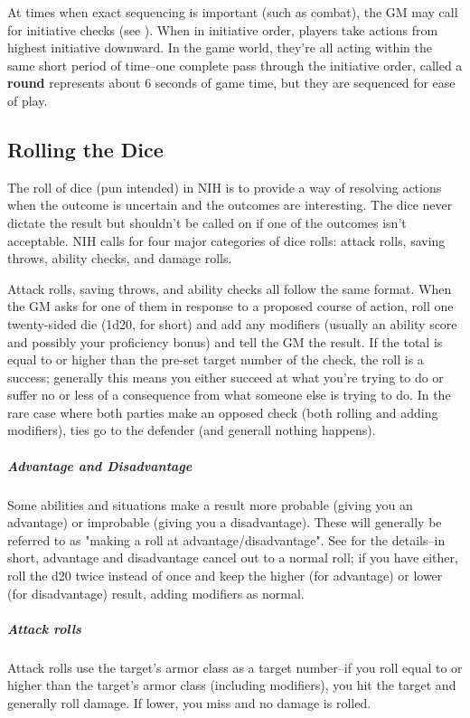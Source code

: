 At times when exact sequencing is important (such as combat), the GM may call for initiative checks (see ). When in initiative order, players take actions from highest initiative downward. In the game world, they're all acting within the same short period of time--one complete pass through the initiative order, called a \textbf{round} represents about 6 seconds of game time, but they are sequenced for ease of play.

\subsection{Rolling the Dice}
The roll of dice (pun intended) in NIH is to provide a way of resolving actions when the outcome is uncertain and the outcomes are interesting. The dice never dictate the result but shouldn't be called on if one of the outcomes isn't acceptable. NIH calls for four major categories of dice rolls: attack rolls, saving throws, ability checks, and damage rolls.

Attack rolls, saving throws, and ability checks all follow the same format. When the GM asks for one of them in response to a proposed course of action, roll one twenty-sided die (1d20, for short) and add any modifiers (usually an ability score and possibly your proficiency bonus) and tell the GM the result. If the total is equal to or higher than the pre-set target number of the check, the roll is a success; generally this means you either succeed at what you're trying to do or suffer no or less of a consequence from what someone else is trying to do. In the rare case where both parties make an opposed check (both rolling and adding modifiers), ties go to the defender (and generall nothing happens).

\subparagraph*{Advantage and Disadvantage} Some abilities and situations make a result more probable (giving you an advantage) or improbable (giving you a disadvantage). These will generally be referred to as "making a roll at advantage/disadvantage". See  for the details--in short, advantage and disadvantage cancel out to a normal roll; if you have either, roll the d20 twice instead of once and keep the higher (for advantage) or lower (for disadvantage) result, adding modifiers as normal.

\subparagraph*{Attack rolls} Attack rolls use the target's armor class as a target number--if you roll equal to or higher than the target's armor class (including modifiers), you hit the target and generally roll damage. If lower, you miss and no damage is rolled.

